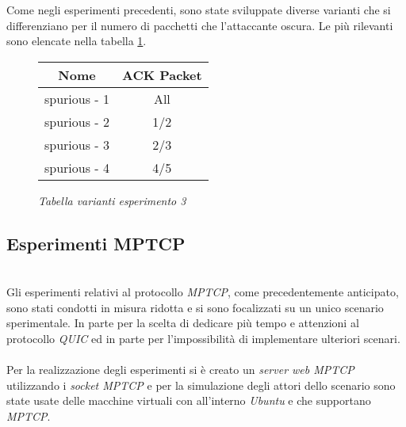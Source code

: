 Come negli esperimenti precedenti, sono state sviluppate diverse varianti che si differenziano per il numero di pacchetti che l'attaccante oscura.
Le più rilevanti sono elencate nella tabella \ref{table-spurious}.
\begin{figure}[!h]
    \centering
    \begin{tabular}{|c|c|}
        \hline
        \textbf{Nome} & \textbf{ACK Packet} \\
        \hline
        spurious - 1  & All \\
        \hline
        spurious - 2 & 1/2 \\
        \hline
        spurious - 3 & 2/3 \\
        \hline
        spurious - 4 & 4/5 \\
        \hline
    \end{tabular}
    \caption{\emph{Tabella varianti esperimento 3}}
    \label{table-spurious}
\end{figure}
\pagebreak
\subsection{Esperimenti MPTCP}
~\\
\indent Gli esperimenti relativi al protocollo \emph{MPTCP}, come precedentemente anticipato, sono stati condotti in misura ridotta e si sono focalizzati su un unico scenario sperimentale.
In parte per la scelta di dedicare più tempo e attenzioni al protocollo \emph{QUIC} ed in parte per l'impossibilità di implementare ulteriori scenari.
\\\\
Per la realizzazione degli esperimenti si è creato un \emph{server web MPTCP} utilizzando i \emph{socket MPTCP} \cite{site:mptcp-code} e per la simulazione degli attori dello scenario sono state usate delle macchine virtuali con all'interno \emph{Ubuntu} e che supportano \emph{MPTCP}.
